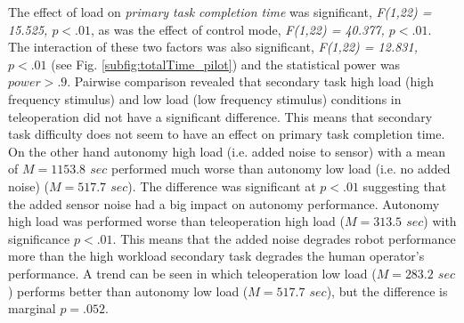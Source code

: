 \documentclass[a4paper,12pt,oneside,openright]{bhamthesis}
\begin{document}
The effect of load on \textit{primary task completion time} was significant, \textit{F(1,22) = 15.525,  $p < .01$}, as was the effect of control mode, \textit{F(1,22) = 40.377, $p < .01$}. The interaction of these two factors was also significant, \textit{F(1,22) = 12.831, $p < .01$} (see Fig. \ref{subfig:totalTime_pilot}) and the statistical power was \textit{$power > .9$}. Pairwise comparison revealed that secondary task high load (high frequency stimulus) and low load (low frequency stimulus) conditions in teleoperation did not have a significant difference. This means that secondary task difficulty does not seem to have an effect on primary task completion time. On the other hand autonomy high load (i.e. added noise to sensor) with a mean of \textit{$M = 1153.8$ $sec$} performed much worse than autonomy low load (i.e. no added noise) (\textit{$M = 517.7$ $sec$}). The difference was significant at \textit{$p <.01$} suggesting that the added sensor noise had a big impact on autonomy performance. Autonomy high load was performed worse than teleoperation high load (\textit{$M = 313.5$ $sec$}) with significance \textit{$p < .01$}. This means that the added noise degrades robot performance more than the high workload secondary task degrades the human operator's performance. A trend can be seen in which teleoperation low load (\textit{$M = 283.2$ $sec$}) performs better than autonomy low load (\textit{$M = 517.7$ $sec$}), but the difference is marginal \textit{$p = .052$}. 
\end{document}
